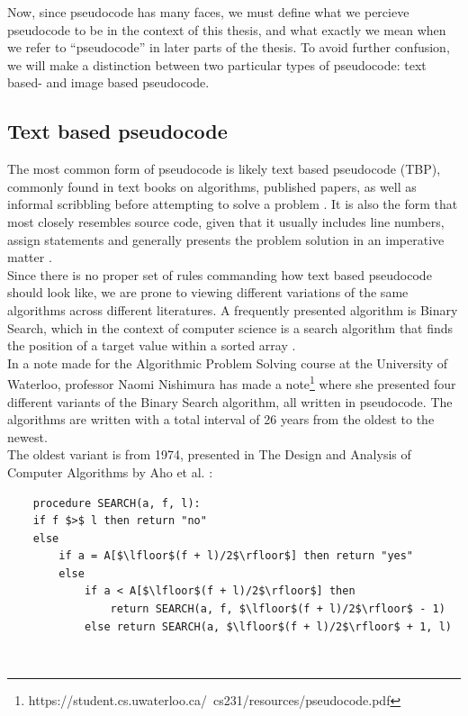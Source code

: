 Now, since pseudocode has many faces, we must define what we percieve pseudocode to be in the context of this thesis, and what exactly we mean when we refer to ``pseudocode'' in later parts of the thesis. To avoid further confusion, we will make a distinction between two particular types of pseudocode: text based- and image based pseudocode.

\subsection{Text based pseudocode}

The most common form of pseudocode is likely text based pseudocode (TBP), commonly found in text books on algorithms, published papers, as well as informal scribbling before attempting to solve a problem \cite{payAttentionToMLPs}\cite{BOOK:intro/Cormen/Leiserson}. It is also the form that most closely resembles source code, given that it usually includes line numbers, assign statements and generally presents the problem solution in an imperative matter \cite{proposalForParadigmGeneralPseudocode}. \hfill \\

Since there is no proper set of rules commanding how text based pseudocode should look like, we are prone to viewing different variations of the same algorithms across different literatures. A frequently presented algorithm is Binary Search, which in the context of computer science is a search algorithm that finds the position of a target value within a sorted array \cite{BOOK:intro/Cormen/Leiserson}. \hfill \\

In a note made for the Algorithmic Problem Solving course at the University of Waterloo, professor Naomi Nishimura has made a note\footnote{https://student.cs.uwaterloo.ca/~cs231/resources/pseudocode.pdf} where she presented four different variants of the Binary Search algorithm, all written in pseudocode. The algorithms are written with a total interval of 26 years from the oldest to the newest. \hfill \\

The oldest variant is from 1974, presented in The Design and Analysis of Computer Algorithms by Aho et al. \cite[139]{BOOK:DesignAnalysis/Aho}:

\begin{lstlisting}
    procedure SEARCH(a, f, l):
    if f $>$ l then return "no"
    else
        if a = A[$\lfloor$(f + l)/2$\rfloor$] then return "yes"
        else
            if a < A[$\lfloor$(f + l)/2$\rfloor$] then
                return SEARCH(a, f, $\lfloor$(f + l)/2$\rfloor$ - 1)
            else return SEARCH(a, $\lfloor$(f + l)/2$\rfloor$ + 1, l)
\end{lstlisting} \hfill \\

